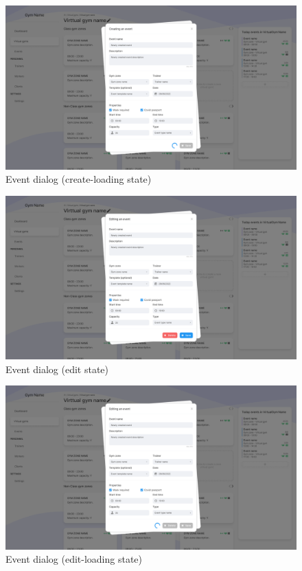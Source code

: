 \documentclass[a4paper, 12pt, oneside]{book}
\begin{document}
\begin{figure}[h!]
	\centering
	\includegraphics[width=\textwidth]{assets/ui/CreateLoadingEvent.png}
	\caption{Event dialog (create-loading state)}
\end{figure}
\begin{figure}[h!]
	\centering
	\includegraphics[width=\textwidth]{assets/ui/EditEvent.png}
	\caption{Event dialog (edit state)}
\end{figure}
\begin{figure}[h!]
	\centering
	\includegraphics[width=\textwidth]{assets/ui/EditLoadingEvent.png}
	\caption{Event dialog (edit-loading state)}
\end{figure}
\end{document}
